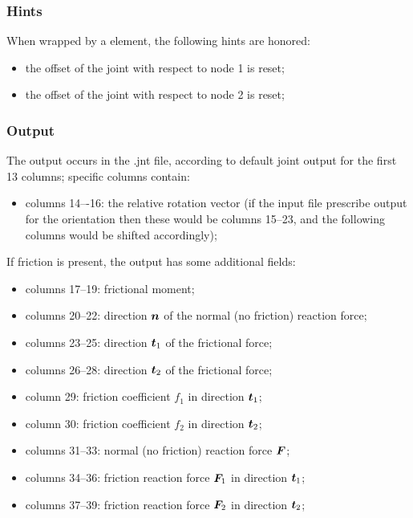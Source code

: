 \subsubsection{Hints}
When wrapped by a  element, the following hints are honored:
\begin{itemize}
\item {} the offset of the joint
with respect to node 1 is reset;
\item {} the offset of the joint
with respect to node 2 is reset;
\end{itemize}
\subsubsection{Output}
The output occurs in the .jnt file, according to default joint output for the first 13 columns; specific
columns contain:
\begin{itemize}
\item  columns 14–-16: the relative rotation vector (if the input file prescribe  output for the orientation then these would be columns 15--23, and the following columns would be shifted accordingly);
\end{itemize}
If friction is present, the output has some additional fields:
\begin{itemize}
\item columns 17--19: frictional moment;
\item columns 20--22: direction $\boldsymbol{n}$ of the normal (no friction) reaction force;
\item columns 23--25: direction $\boldsymbol{t}_1$ of the frictional force;
\item columns 26--28: direction $\boldsymbol{t}_2$ of the frictional force;
\item column 29: friction coefficient $f_1$ in direction $\boldsymbol{t}_1$;
\item column 30: friction coefficient $f_2$ in direction $\boldsymbol{t}_2$;
\item columns 31--33: normal (no friction) reaction force $\boldsymbol{F}$;
\item columns 34--36: friction reaction force $\boldsymbol{F}_1$ in direction $\boldsymbol{t}_1$;
\item columns 37--39: friction reaction force $\boldsymbol{F}_2$ in direction $\boldsymbol{t}_2$;
\end{itemize}



